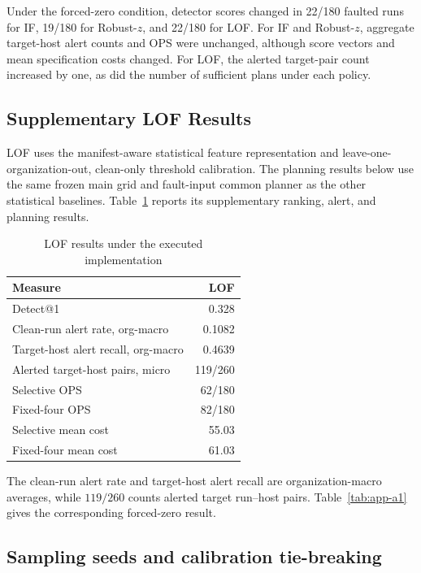 \documentclass[sn-basic]{sn-jnl}%
\theoremstyle{thmstyleone}%
\theoremstyle{thmstyletwo}%
\theoremstyle{thmstylethree}%
\begin{document}
\begin{appendices}
Under the forced-zero condition, detector scores changed in 22/180 faulted runs for IF, 19/180 for Robust-\(z\), and 22/180 for LOF. For IF and Robust-\(z\), aggregate target-host alert counts and OPS were unchanged, although score vectors and mean specification costs changed. For LOF, the alerted target-pair count increased by one, as did the number of sufficient plans under each policy.

\subsection{Supplementary LOF Results}\label{app:a-2}

LOF uses the manifest-aware statistical feature representation and leave-one-organization-out, clean-only threshold calibration. The planning results below use the same frozen main grid and fault-input common planner as the other statistical baselines. Table~\ref{tab:app-a2} reports its supplementary ranking, alert, and planning results.

\begin{table}[htbp]
\centering
\caption{LOF results under the executed implementation}
\label{tab:app-a2}
\small
\setlength{\tabcolsep}{3pt}
\renewcommand{\arraystretch}{1.1}
\begin{tabularx}{\linewidth}{@{}Xr@{}}
\toprule
Measure & LOF \\
\midrule
Detect@1 & 0.328 \\
Clean-run alert rate, org-macro & 0.1082 \\
Target-host alert recall, org-macro & 0.4639 \\
Alerted target-host pairs, micro & 119/260 \\
Selective OPS & 62/180 \\
Fixed-four OPS & 82/180 \\
Selective mean cost & 55.03 \\
Fixed-four mean cost & 61.03 \\
\bottomrule
\end{tabularx}
\end{table}

The clean-run alert rate and target-host alert recall are organization-macro averages, while \(119/260\) counts alerted target run--host pairs. Table~\ref{tab:app-a1} gives the corresponding forced-zero result.

\subsection{Sampling seeds and calibration tie-breaking}\label{app:a-3}


\end{appendices}
\end{document}

